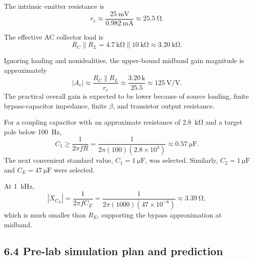 \documentclass[11pt,a4paper]{article}
\begin{document}
\begin{examplebox}
The intrinsic emitter resistance is
\begin{equation}
r_e\approx\frac{\SI{25}{\milli\volt}}
{\SI{0.982}{\milli\ampere}}
\approx\SI{25.5}{\ohm}.
\end{equation}

The effective AC collector load is
\begin{equation}
R_C\parallel R_L
=
\SI{4.7}{\kilo\ohm}\parallel\SI{10}{\kilo\ohm}
\approx\SI{3.20}{\kilo\ohm}.
\end{equation}

Ignoring loading and nonidealities, the upper-bound midband gain magnitude is
approximately
\begin{equation}
|A_v|\approx\frac{R_C\parallel R_L}{r_e}
\approx\frac{3.20\,\text{k}}{25.5}
\approx\SI{125}{\volt\per\volt}.
\end{equation}
The practical overall gain is expected to be lower because of source loading,
finite bypass-capacitor impedance, finite $\beta$, and transistor output
resistance.

For a coupling capacitor with an approximate resistance of
\SI{2.8}{\kilo\ohm} and a target pole below \SI{100}{\hertz},
\begin{equation}
C_1\geq
\frac{1}{2\pi fR}
=
\frac{1}{2\pi(100)(2.8\times10^3)}
\approx\SI{0.57}{\micro\farad}.
\end{equation}
The next convenient standard value, $C_1=\SI{1}{\micro\farad}$, was selected.
Similarly, $C_2=\SI{1}{\micro\farad}$ and
$C_E=\SI{47}{\micro\farad}$ were selected.

At \SI{1}{\kilo\hertz},
\begin{equation}
|X_{C_E}|=
\frac{1}{2\pi fC_E}
=
\frac{1}{2\pi(1000)(47\times10^{-6})}
\approx\SI{3.39}{\ohm},
\end{equation}
which is much smaller than $R_E$, supporting the bypass approximation at
midband.
\end{examplebox}

\subsection*{6.4 Pre-lab simulation plan and prediction}
\end{document}
